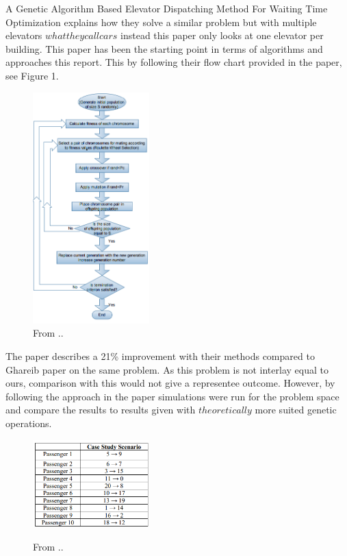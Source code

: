 
A Genetic Algorithm Based Elevator Dispatching Method For Waiting Time Optimization \cite{tartan2016genetic} explains how they solve a similar problem but with multiple elevators \( what they call cars \) instead this paper only looks at one elevator per building. This paper has been the starting point in terms of algorithms and approaches this report. This by following their flow chart provided in the paper, see Figure 1. 

\begin{figure}[ht]
\centering
\includegraphics[width=0.4\textwidth]{diagram_1.png}
\caption{From ..}
	\label{fig:Flow_1}
\end{figure}
The paper describes a 21\% improvement with their methods compared to Ghareib paper \cite{gharieb2005optimal} on the same problem. As this problem is not interlay equal to ours, comparison with this would not give a representee outcome. However, by following the approach in the paper simulations were run for the problem space and compare the results to results given with \( theoretically \) more suited genetic operations.
\newpage

\begin{figure}[ht]
\centering
\includegraphics[width=0.4\textwidth]{tabel_1.png}
	\label{fig:Tabel_1}
\caption{From ..}
\end{figure}

